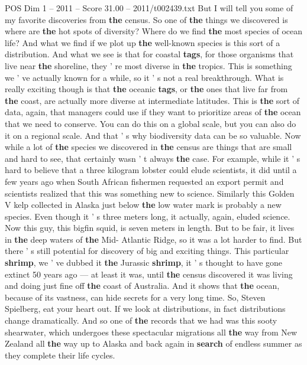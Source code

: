 \begin{textsample}{POS Dim 1 – 2011 – Score 31.00 – 2011/t002439.txt}
But I will tell you some of my favorite discoveries from \textbf{the} census.
So one of \textbf{the} things we discovered is where are \textbf{the} hot spots of diversity?
Where do we find \textbf{the} most species of ocean life?
And what we find if we plot up \textbf{the} well-known species is this sort of a distribution.
And what we see is that for coastal \textbf{tags}, for those organisms that live near \textbf{the} shoreline, they ' re most diverse in \textbf{the} tropics.
This is something we ' ve actually known for a while, so it ' s not a real breakthrough.
What is really exciting though is that \textbf{the} oceanic \textbf{tags}, or \textbf{the} ones that live far from \textbf{the} coast, are actually more diverse at intermediate latitudes.
This is \textbf{the} sort of data, again, that managers could use if they want to prioritize areas of \textbf{the} ocean that we need to conserve.
You can do this on a global scale, but you can also do it on a regional scale.
And that ' s why biodiversity data can be so valuable.
Now while a lot of \textbf{the} species we discovered in \textbf{the} census are things that are small and hard to see, that certainly wasn ' t always \textbf{the} case.
For example, while it ' s hard to believe that a three kilogram lobster could elude scientists, it did until a few years ago when South African fishermen requested an export permit and scientists realized that this was something new to science.
Similarly this Golden V kelp collected in Alaska just below \textbf{the} low water mark is probably a new species.
Even though it ' s three meters long, it actually, again, eluded science.
Now this guy, this bigfin squid, is seven meters in length.
But to be fair, it lives in \textbf{the} deep waters of \textbf{the} Mid- Atlantic Ridge, so it was a lot harder to find.
But there ' s still potential for discovery of big and exciting things.
This particular \textbf{shrimp}, we ' ve dubbed it \textbf{the} Jurassic \textbf{shrimp}, it ' s thought to have gone extinct 50 years ago — at least it was, until \textbf{the} census discovered it was living and doing just fine off \textbf{the} coast of Australia.
And it shows that \textbf{the} ocean, because of its vastness, can hide secrets for a very long time.
So, Steven Spielberg, eat your heart out.
If we look at distributions, in fact distributions change dramatically.
And so one of \textbf{the} records that we had was this sooty shearwater, which undergoes these spectacular migrations all \textbf{the} way from New Zealand all \textbf{the} way up to Alaska and back again in \textbf{search} of endless summer as they complete their life cycles.

\end{textsample}
